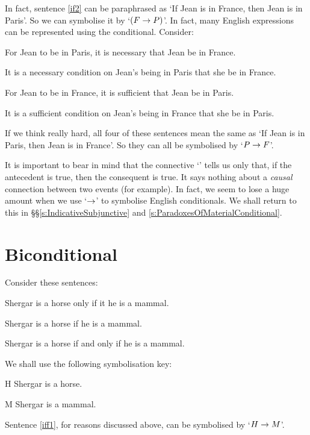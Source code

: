 In fact, sentence \ref{if2} can be paraphrased as `If Jean is in France, then Jean is in Paris'. So we can symbolise it by `$(F \rightarrow P)$'.
\noindent In fact, many English expressions can be represented using the conditional. Consider:
	\begin{earg}
		\item[\ex{ifnec1}] For Jean to be in Paris, it is necessary that Jean be in France.
		\item[\ex{ifnec2}] It is a necessary condition on Jean's being in Paris that she be in France. 
		\item[\ex{ifsuf1}] For Jean to be in France, it is sufficient that Jean be in Paris.
		\item[\ex{ifsuf2}] It is a sufficient condition on Jean's being in France that she be in Paris.
	\end{earg}
If we think really hard, all four of these sentences mean the same as  `If Jean is in Paris, then Jean is in France'. So they can all be symbolised by `$P \rightarrow F$'. 

It is important to bear in mind that the connective `\eif' tells us only that, if the antecedent is true, then the consequent is true. It says nothing about a \emph{causal} connection between two events (for example). In fact, we seem to lose a huge amount when we use `$\rightarrow$' to symbolise English conditionals. We shall return to this in §§\ref{s:IndicativeSubjunctive} and \ref{s:ParadoxesOfMaterialConditional}.

\section{Biconditional}
Consider these sentences:
\begin{earg}
	\item[\ex{iff1}] Shergar is a horse only if it he is a mammal.
	\item[\ex{iff2}] Shergar is a horse if he is a mammal.
	\item[\ex{iff3}] Shergar is a horse if and only if he is a mammal.
\end{earg}
We shall use the following symbolisation key:
	\begin{ekey}
		\item[H] Shergar is a horse.
		\item[M] Shergar is a mammal.
	\end{ekey}
Sentence \ref{iff1}, for reasons discussed above, can be symbolised by `$H \rightarrow M$'.

